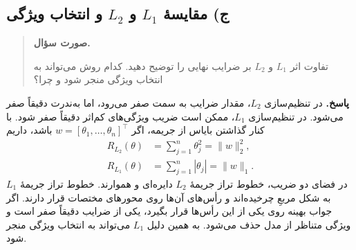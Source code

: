 \documentclass{article}
\numberwithin{equation}{section}
\numberwithin{table}{section}
\newenvironment{questionprompt}{%
    \begin{quote}\noindent\textbf{صورت سؤال.}\enspace\ignorespaces
}{%
    \end{quote}\noindent\textbf{پاسخ.}\enspace\ignorespacesafterend
}
\begin{document}
\subsection*{ج) مقایسهٔ \(L_1\) و \(L_2\) و انتخاب ویژگی}
\begin{questionprompt}
    تفاوت اثر \(L_1\) و \(L_2\) بر ضرایب نهایی را توضیح دهید. کدام روش می‌تواند به انتخاب ویژگی منجر شود و چرا؟
\end{questionprompt}
در تنظیم‌سازی \(L_2\)، مقدار ضرایب به سمت صفر می‌رود، اما به‌ندرت دقیقاً صفر می‌شود. در تنظیم‌سازی \(L_1\)، ممکن است ضریب ویژگی‌های کم‌اثر دقیقاً صفر شود. با کنار گذاشتن بایاس از جریمه، اگر \(w=[\theta_1,\ldots,\theta_n]^\top\) باشد، داریم
\begin{align*}
    R_{L_2}(\theta)&=\sum_{j=1}^{n}\theta_j^2=\lVert w\rVert_2^2,\\
    R_{L_1}(\theta)&=\sum_{j=1}^{n}|\theta_j|=\lVert w\rVert_1.
\end{align*}
در فضای دو ضریب، خطوط تراز جریمهٔ \(L_2\) دایره‌ای و هموارند. خطوط تراز جریمهٔ \(L_1\) به شکل مربعِ چرخیده‌اند و رأس‌های آن‌ها روی محورهای مختصات قرار دارند. اگر جواب بهینه روی یکی از این رأس‌ها قرار بگیرد، یکی از ضرایب دقیقاً صفر است و ویژگی متناظر از مدل حذف می‌شود. به همین دلیل \(L_1\) می‌تواند به انتخاب ویژگی منجر شود.
\end{document}
